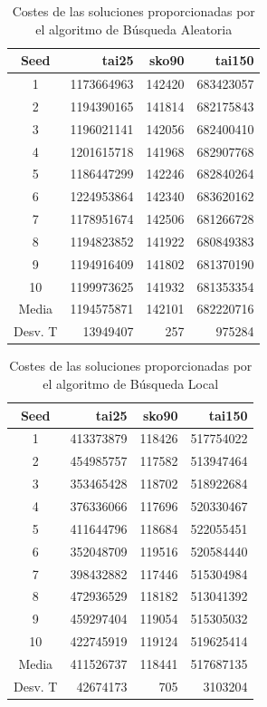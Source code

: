 \documentclass[runningheads,a4paper]{llncs}
\begin{document}
\begin{table}[H]
\centering
\caption{Costes de las soluciones proporcionadas por el algoritmo de Búsqueda Aleatoria}

\begin{tabular}{c || r | r | r }
Seed & \qquad  tai25 \qquad \quad & \qquad sko90 \qquad & \qquad \qquad tai150 \qquad\\\hline 
1 	& 1173664963 & 142420 & 683423057 \\
2	& 1194390165 & 141814 & 682175843 \\
3	& 1196021141 & 142056 & 682400410 \\
4	& 1201615718 & 141968 & 682907768 \\
5	& 1186447299 & 142246 & 682840264 \\
6	& 1224953864 & 142340 & 683620162 \\
7	& 1178951674 & 142506 & 681266728 \\
8	& 1194823852 & 141922 & 680849383 \\
9	& 1194916409 & 141802 & 681370190 \\
10	& 1199973625 & 141932 & 681353354 \\ \hline \hline
Media & 1194575871 & 142101 & 682220716 \\
Desv. T & 13949407 & 257 & 975284\\
\end{tabular}
\end{table}


\begin{table}[H]
\centering
\caption{Costes de las soluciones proporcionadas por el algoritmo de Búsqueda Local}

\begin{tabular}{c || r | r | r }
Seed & \qquad  tai25 \qquad \quad & \qquad sko90 \qquad & \qquad \qquad tai150 \qquad\\\hline 
1 	& 413373879 & 118426 & 517754022   \\
2	& 454985757 & 117582 & 513947464 		\\
3	& 353465428 & 118702 & 518922684 	\\
4	& 376336066 & 117696 & 520330467 	\\
5	& 411644796 & 118684 & 522055451 	\\
6	& 352048709 & 119516 & 520584440	\\
7	& 398432882 & 117446 & 515304984 	\\
8	& 472936529 & 118182 & 513041392 \\
9	& 459297404 & 119054 & 515305032 \\
10	& 422745919 & 119124 & 519625414 	\\ \hline \hline
Media & 411526737 & 118441 & 517687135\\
Desv. T &42674173 & 705 & 3103204\\
\end{tabular}
\end{table}
\end{document}
